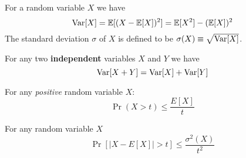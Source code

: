 \documentclass{article}
\begin{document}
\begin{definition}[Variance]%
For a random variable $X$ we have 
\begin{equation}
{\operatorname{Var}}[X] = {\mathbb E}[(X - {\mathbb E}[X])^2] = {\mathbb E}[X^2] - ({\mathbb E}[X])^2
\end{equation}
The standard deviation $\sigma$ of $X$ is defined to be $\sigma(X) \equiv \sqrt{{\operatorname{Var}}[X]}$.
\end{definition}

\begin{definition}%
For any two {\bf independent} variables $X$ and $Y$ we have 
\begin{equation}
{\operatorname{Var}}[X + Y] = {\operatorname{Var}}[X] + {\operatorname{Var}}[Y]
\end{equation}
\end{definition}

\begin{fact}%
For any {\it positive} random variable $X$:
\begin{equation}
\Pr(X > t) \le \frac{E[X]}{t}
\end{equation}
\end{fact}

\begin{fact}%
For any random variable $X$
\begin{equation}
\Pr[|X-E[X]| > t] \le \frac{\sigma^2(X)}{t^2}
\end{equation}
\end{fact}
\end{document}
